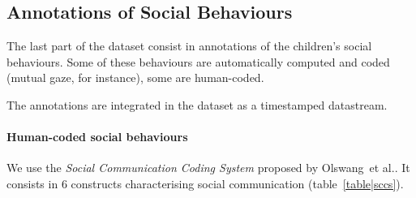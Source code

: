 \documentclass{article}
\newcommand{\etal}{et al.\xspace}
\begin{document}
\subsection{Annotations of Social Behaviours}

The last part of the dataset consist in annotations of the
children's social behaviours. Some of these behaviours are automatically
computed and coded (mutual gaze, for instance), some are human-coded.

The annotations are integrated in the dataset as a timestamped datastream.

\paragraph{Human-coded social behaviours}

We use the \emph{Social Communication Coding System} proposed by
Olswang~\etal\cite{olswang2006reliability}. It consists in 6 constructs
characterising social communication (table~\ref{table|sccs}).
\end{document}
